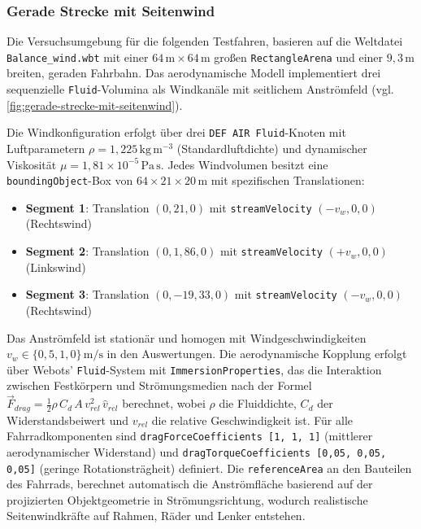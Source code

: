 

    


    \subsubsection{Gerade Strecke mit Seitenwind}

    Die Versuchsumgebung für die folgenden Testfahren, basieren auf die Weltdatei \texttt{Balance\_wind.wbt} mit einer $64\,\text{m} \times 64\,\text{m}$ großen 
    \texttt{RectangleArena} und einer $9{,}3\,\text{m}$ breiten, geraden Fahrbahn. 
    Das aerodynamische Modell implementiert drei sequenzielle \texttt{Fluid}-Volumina als Windkanäle mit seitlichem Anströmfeld (vgl. \autoref{fig:gerade-strecke-mit-seitenwind}).
    
    Die Windkonfiguration erfolgt über drei \texttt{DEF AIR Fluid}-Knoten mit Luftparametern $\rho=1{,}225\,\mathrm{kg\,m^{-3}}$ 
    (Standardluftdichte) und dynamischer Viskosität $\mu=1{,}81\times10^{-5}\,\mathrm{Pa\,s}$. Jedes Windvolumen besitzt 
    eine \texttt{boundingObject}-Box von $64\times21\times20\,\mathrm{m}$ mit spezifischen Translationen:
    \begin{itemize}
        \item \textbf{Segment 1}: Translation $(0, 21, 0)$ mit \texttt{streamVelocity} $(-v_w, 0, 0)$ (Rechtswind)
        \item \textbf{Segment 2}: Translation $(0, 1{,}86, 0)$ mit \texttt{streamVelocity} $(+v_w, 0, 0)$ (Linkswind)  
        \item \textbf{Segment 3}: Translation $(0, -19{,}33, 0)$ mit \texttt{streamVelocity} $(-v_w, 0, 0)$ (Rechtswind)
    \end{itemize}
    
    Das Anströmfeld ist stationär und homogen mit Windgeschwindigkeiten $v_w\in\{0{,}5, 1{,}0\}\,\mathrm{m/s}$ 
    in den Auswertungen. Die aerodynamische Kopplung erfolgt über Webots' \texttt{Fluid}-System mit 
    \texttt{ImmersionProperties}, das die Interaktion zwischen Festkörpern und Strömungsmedien nach der 
    Formel $\vec{F}_{drag} = \frac{1}{2} \rho \, C_d \, A \, v_{rel}^2 \, \hat{v}_{rel}$ berechnet, wobei 
    $\rho$ die Fluiddichte, $C_d$ der Widerstandsbeiwert und $v_{rel}$ die relative Geschwindigkeit ist. 
    Für alle Fahrradkomponenten sind \texttt{dragForceCoefficients [1, 1, 1]} (mittlerer aerodynamischer Widerstand) 
    und \texttt{dragTorqueCoefficients [0{,}05, 0{,}05, 0{,}05]} (geringe Rotationsträgheit) definiert. 
    Die \texttt{referenceArea} an den Bauteilen des Fahrrads, berechnet automatisch die Anströmfläche basierend auf der 
    projizierten Objektgeometrie in Strömungsrichtung, wodurch realistische Seitenwindkräfte auf Rahmen, 
    Räder und Lenker entstehen.

